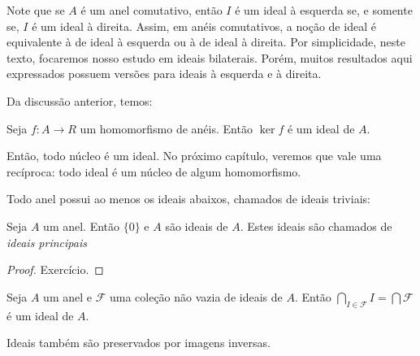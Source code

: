 Note que se $A$ é um anel comutativo, então $I$ é um ideal à esquerda se, e somente se, $I$ é um ideal à direita.
Assim, em anéis comutativos, a noção de ideal é equivalente à de ideal à esquerda ou à de ideal à direita.
Por simplicidade, neste texto, focaremos nosso estudo em ideais bilaterais.
Porém, muitos resultados aqui expressados possuem versões para ideais à esquerda e à direita.

Da discussão anterior, temos:

\begin{corol}
    Seja $f:A\rightarrow R$ um homomorfismo de anéis. Então $\ker f$ é um ideal de $A$.
\end{corol}

Então, todo núcleo é um ideal.
No próximo capítulo, veremos que vale uma recíproca: todo ideal é um núcleo de algum homomorfismo.

Todo anel possui ao menos os ideais abaixos, chamados de ideais triviais:

\begin{prop}Seja $A$ um anel. Então $\{0\}$ e $A$ são ideais de $A$. Estes ideais são chamados de \emph{ideais principais}
\end{prop}
\begin{proof}
    Exercício.
\end{proof}

\begin{prop}
    Seja $A$ um anel e $\mathcal F$ uma coleção não vazia de ideais de $A$. Então $\bigcap_{I \in \mathcal F}I=\bigcap \mathcal F$ é um ideal de $A$.
\end{prop}

Ideais também são preservados por imagens inversas.

